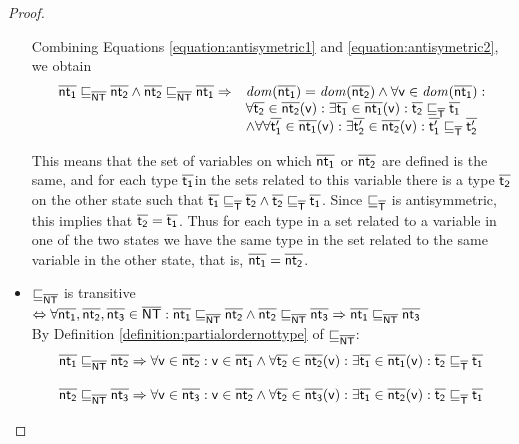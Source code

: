 \documentclass{llncs}
\begin{document}
\begin{lemma}
\begin{proof}
\begin{itemize}
Combining Equations \ref{equation:antisymetric1} and \ref{equation:antisymetric2}, we obtain 
\begin{equation}
\label{equation:antisymetric3}
\begin{array}{ll}
\mathsf{\overline{nt_1}} \sqsubseteq_{\mathsf{\overline{NT}}} \mathsf{\overline{nt_2}} \land \mathsf{\overline{nt_2}} \sqsubseteq_{\mathsf{\overline{NT}}} \mathsf{\overline{nt_1}} \Rightarrow &\mathit{dom}(\mathsf{\overline{nt_1}})=\mathit{dom}(\mathsf{\overline{nt_2}}) \land \forall \mathsf{v} \in \mathit{dom}(\mathsf{\overline{nt_1}}) :\\
& \forall \mathsf{\overline{t_2}} \in \mathsf{\overline{nt_2}}(\mathsf{v}) : \exists \mathsf{\overline{t_1}} \in \mathsf{\overline{nt_1}}(\mathsf{v}) : \mathsf{\overline{t_2}} \sqsubseteq_{\mathsf{\overline{T}}} \mathsf{\overline{t_1}}\\
& \land \forall \forall \mathsf{\overline{t'_1}} \in \mathsf{\overline{nt_1}}(\mathsf{v}) : \exists \mathsf{\overline{t'_2}} \in \mathsf{\overline{nt_2}}(\mathsf{v}) : \mathsf{\overline{t'_1}} \sqsubseteq_{\mathsf{\overline{T}}} \mathsf{\overline{t'_2}}
\end{array}
\end{equation}

This means that the set of variables on which $\mathsf{\overline{nt_1}}$ or $\mathsf{\overline{nt_2}}$ are defined is the same, and for each type $\mathsf{\overline{t_1}}$in the sets related to this variable there is a type $\mathsf{\overline{t_2}}$ on the other state such that $\mathsf{\overline{t_1}} \sqsubseteq_{\mathsf{\overline{T}}} \mathsf{\overline{t_2}} \land \mathsf{\overline{t_2}} \sqsubseteq_{\mathsf{\overline{T}}} \mathsf{\overline{t_1}}$. Since $\sqsubseteq_{\mathsf{\overline{T}}}$ is antisymmetric, this implies that  $\mathsf{\overline{t_2}}=\mathsf{\overline{t_1}}$. Thus for each type in a set related to a variable in one of the two states we have the same type in the set related to the same variable in the other state, that is, $\mathsf{\overline{nt_1}}=\mathsf{\overline{nt_2}}$.

\item $\sqsubseteq_{\mathsf{\overline{NT}}}$ is transitive $\Leftrightarrow \forall \mathsf{\overline{nt_1}}, \mathsf{\overline{nt_2}}, \mathsf{\overline{nt_3}} \in \mathsf{\overline{NT}} : \mathsf{\overline{nt_1}} \sqsubseteq_{\mathsf{\overline{NT}}} \mathsf{\overline{nt_2}} \land \mathsf{\overline{nt_2}} \sqsubseteq_{\mathsf{\overline{NT}}} \mathsf{\overline{nt_3}} \Rightarrow \mathsf{\overline{nt_1}} \sqsubseteq_{\mathsf{\overline{NT}}} \mathsf{\overline{nt_3}}$\\
By Definition \ref{definition:partialordernottype} of $\sqsubseteq_{\mathsf{\overline{NT}}}$:
\begin{equation}
\label{equation:transitive1}
\mathsf{\overline{nt_1}} \sqsubseteq_{\mathsf{\overline{NT}}} \mathsf{\overline{nt_2}} \Rightarrow \forall \mathsf{v} \in \mathsf{\overline{nt_2}} : \mathsf{v} \in \mathsf{\overline{nt_1}} \land \forall \mathsf{\overline{t_2}} \in \mathsf{\overline{nt_2}}(\mathsf{v}) : \exists \mathsf{\overline{t_1}} \in \mathsf{\overline{nt_1}}(\mathsf{v}) : \mathsf{\overline{t_2}} \sqsubseteq_{\mathsf{\overline{T}}} \mathsf{\overline{t_1}}
\end{equation}

\begin{equation}
\label{equation:transitive2}
\mathsf{\overline{nt_2}} \sqsubseteq_{\mathsf{\overline{NT}}} \mathsf{\overline{nt_3}} \Rightarrow \forall \mathsf{v} \in \mathsf{\overline{nt_3}} : \mathsf{v} \in \mathsf{\overline{nt_2}} \land \forall \mathsf{\overline{t_2}} \in \mathsf{\overline{nt_3}}(\mathsf{v}) : \exists \mathsf{\overline{t_1}} \in \mathsf{\overline{nt_2}}(\mathsf{v}) : \mathsf{\overline{t_2}} \sqsubseteq_{\mathsf{\overline{T}}} \mathsf{\overline{t_1}}
\end{equation}


\end{itemize}
\end{proof}
\end{lemma}
\end{document}
